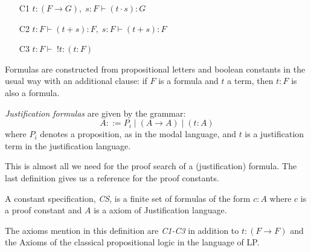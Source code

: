 \begin{rules}\label{rules} 

\begin{itemize} Application, sum and positive introspection respectively.

	\item[C1] $t:(F \rightarrow G), \; s:F \vdash (t \cdot s): G$\label{rule:c1}
	\item[C2] $t:F \vdash (t +s):F, \; s:F \vdash (t+s):F$\label{rule:c2}
	\item[C3] $t:F \vdash \; !t:(t:F)$\label{rule:c3}
\end{itemize}

\end{rules}

Formulas are constructed from propositional letters and boolean constants in the usual way with an additional clause: if $F$ is a formula and $t$ a term, then $t:F$ is also a formula.

\begin{definition}\label{justification_formulas} \emph{Justification formulas} are given by the grammar:
\[
A ::= P_i\;|\;(A \rightarrow A) \;|\; (t:A)
\]
where $P_i$ denotes a proposition, as in the modal language, and $t$ is a justification term in the justification language.
\end{definition}

This is almost all we need for the proof search of a (justification) formula. The last definition gives us a reference for the proof constants.

\begin{definition}\label{cs-def} A constant specification, \emph{CS}, is a finite set of formulas of the form $c:A$ where $c$ is a proof constant and $A$ is a axiom of Justification language.
\end{definition}

The axioms mention in this definition are \emph{C1-C3} in addition to $t:(F \rightarrow F)$ and the Axioms of the classical propositional logic in the language of LP.


